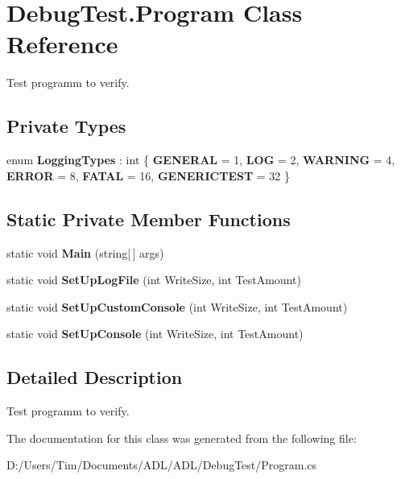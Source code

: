 \hypertarget{class_debug_test_1_1_program}{}\section{Debug\+Test.\+Program Class Reference}
\label{class_debug_test_1_1_program}


Test programm to verify.  


\subsection*{Private Types}
\begin{DoxyCompactItemize}
\item 
\mbox{\label{class_debug_test_1_1_program_a089211932d840b12e435553f833e5897}} 
enum {\bfseries Logging\+Types} \+: int \{ \newline
{\bfseries G\+E\+N\+E\+R\+AL} = 1, 
{\bfseries L\+OG} = 2, 
{\bfseries W\+A\+R\+N\+I\+NG} = 4, 
{\bfseries E\+R\+R\+OR} = 8, 
\newline
{\bfseries F\+A\+T\+AL} = 16, 
{\bfseries G\+E\+N\+E\+R\+I\+C\+T\+E\+ST} = 32
 \}
\end{DoxyCompactItemize}
\subsection*{Static Private Member Functions}
\begin{DoxyCompactItemize}
\item 
\mbox{\label{class_debug_test_1_1_program_aa61923e3897d53c6c33293c16016ad86}} 
static void {\bfseries Main} (string\mbox{[}$\,$\mbox{]} args)
\item 
\mbox{\label{class_debug_test_1_1_program_ac62a6336f3a9323c24330aff285922a2}} 
static void {\bfseries Set\+Up\+Log\+File} (int Write\+Size, int Test\+Amount)
\item 
\mbox{\label{class_debug_test_1_1_program_ad48f1fd9696f02152b71fdbf83a7c040}} 
static void {\bfseries Set\+Up\+Custom\+Console} (int Write\+Size, int Test\+Amount)
\item 
\mbox{\label{class_debug_test_1_1_program_afefa8176a3d5dd17f4d9e55636bb97b6}} 
static void {\bfseries Set\+Up\+Console} (int Write\+Size, int Test\+Amount)
\end{DoxyCompactItemize}


\subsection{Detailed Description}
Test programm to verify. 



The documentation for this class was generated from the following file\+:\begin{DoxyCompactItemize}
\item 
D\+:/\+Users/\+Tim/\+Documents/\+A\+D\+L/\+A\+D\+L/\+Debug\+Test/Program.\+cs\end{DoxyCompactItemize}
